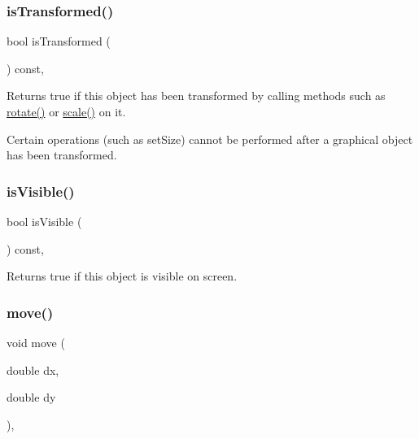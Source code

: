 \subsubsection{\texorpdfstring{is\+Transformed()}{isTransformed()}}
{\footnotesize\ttfamily bool is\+Transformed (\begin{DoxyParamCaption}{ }\end{DoxyParamCaption}) const\hspace{0.3cm}{\ttfamily [virtual]}, {\ttfamily [inherited]}}



Returns {\ttfamily true} if this object has been transformed by calling methods such as \mbox{\hyperlink{classGObject_ae1ffaa12185dfd5ba464f7d87c329e26}{rotate()}} or \mbox{\hyperlink{classGObject_ad2e1900f730475c2d044817db03b38d6}{scale()}} on it. 

Certain operations (such as set\+Size) cannot be performed after a graphical object has been transformed. \mbox{\label{classGObject_a9d8a6cfb13917785c143e74d40e4e2be}} 
\subsubsection{\texorpdfstring{is\+Visible()}{isVisible()}}
{\footnotesize\ttfamily bool is\+Visible (\begin{DoxyParamCaption}{ }\end{DoxyParamCaption}) const\hspace{0.3cm}{\ttfamily [virtual]}, {\ttfamily [inherited]}}



Returns {\ttfamily true} if this object is visible on screen. 

\mbox{\label{classGObject_a5973d8dda83afb36e2c56855515be392}} 
\subsubsection{\texorpdfstring{move()}{move()}}
{\footnotesize\ttfamily void move (\begin{DoxyParamCaption}\item[{double}]{dx,  }\item[{double}]{dy }\end{DoxyParamCaption})\hspace{0.3cm}{\ttfamily [virtual]}, {\ttfamily [inherited]}}



